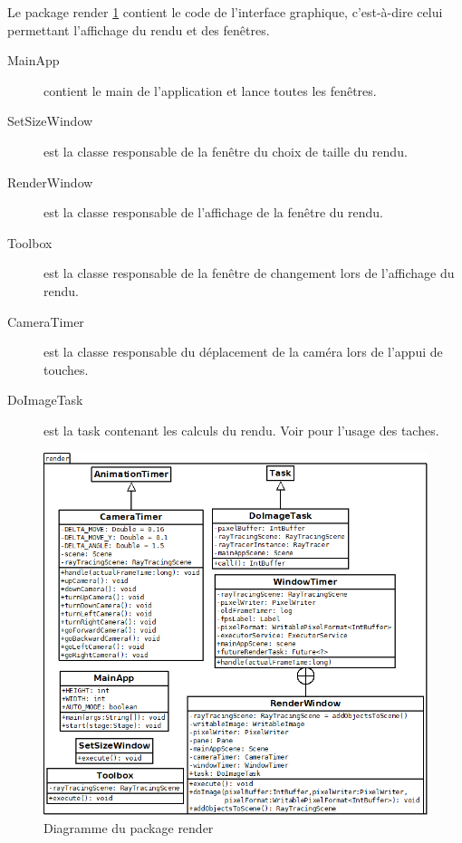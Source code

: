 Le package render \ref{diagRender} contient le code de l'interface graphique, c'est-à-dire celui permettant l'affichage du rendu et des fenêtres.

\begin{description}
    \item [MainApp] contient le main de l'application et lance toutes les fenêtres.
    \item [SetSizeWindow] est la classe responsable de la fenêtre du choix de taille du rendu.
    \item [RenderWindow] est la classe responsable de l'affichage de la fenêtre du rendu.
    \item [Toolbox] est la classe responsable de la fenêtre de changement lors de l'affichage du rendu.
    \item [CameraTimer] est la classe responsable du déplacement de la caméra lors de l'appui de touches.
    \item [DoImageTask] est la task contenant les calculs du rendu. Voir  pour l'usage des taches.
\end{description}



\begin{figure}[h]
   \begin{center}
       \includegraphics[scale=0.5]{img/render.javafx/diagClassRender.png}
   \end{center}
   \caption{Diagramme du package render \label{diagRender}}
\end{figure}
